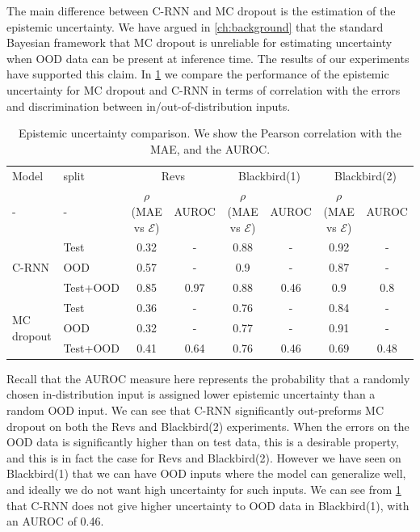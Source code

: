 \documentclass[../main.tex]{subfiles}
\begin{document}
The main difference between C-RNN and MC dropout is the estimation of the epistemic uncertainty. We have argued in \cref{ch:background} that the standard Bayesian framework that MC dropout is unreliable for estimating uncertainty when OOD data can be present at inference time. The results of our experiments have supported this claim. In \cref{tbl:epistemic_comparison} we compare the performance of the epistemic uncertainty for MC dropout and C-RNN in terms of correlation with the errors and discrimination between in/out-of-distribution inputs. 

\begin{table}[htbp]
\centering
\begin{adjustbox}{max width=\textwidth}
    \begin{tabular}{l l c c c c c c}  
        \toprule
        Model & split & \multicolumn{2}{c}{Revs} & \multicolumn{2}{c}{Blackbird(1)} & \multicolumn{2}{c}{Blackbird(2)}\\
        - & - & $\rho$(MAE vs $\mathcal{E}$) & AUROC &
        $\rho$(MAE vs $\mathcal{E}$) & AUROC & $\rho$(MAE vs $\mathcal{E}$)  & AUROC \\
        \midrule
        \multirow{3}{*}{C-RNN} 
            & Test     & 0.32 & -    & 0.88 & -    & 0.92 & -   \\  
            & OOD      & 0.57 & -    & 0.9  & -    & 0.87 & -   \\  
            & Test+OOD & 0.85 & 0.97 & 0.88 & 0.46 & 0.9  & 0.8 \\ 

        \midrule
        \multirow{3}{*}{MC dropout} 
            & Test     & 0.36 & -    & 0.76  & -    & 0.84 & -  \\  
            & OOD      & 0.32 & -    & 0.77  & -    & 0.91  &  -  \\  
            & Test+OOD & 0.41 & 0.64 & 0.76  & 0.46 & 0.69 & 0.48 \\ 
        
        \toprule
    \end{tabular}
\end{adjustbox}
    \caption[Epistemic uncertainty comparison]{Epistemic uncertainty comparison. We show the Pearson correlation with the MAE, and the AUROC.}
    \label{tbl:epistemic_comparison}
\end{table}

Recall that the AUROC measure here represents the probability that a randomly chosen in-distribution input is assigned lower epistemic uncertainty than a random OOD input. We can see that C-RNN significantly out-preforms MC dropout on both the Revs and Blackbird(2) experiments. When the errors on the OOD data is significantly higher than on test data, this is a desirable property, and this is in fact the case for Revs and Blackbird(2). However we have seen on Blackbird(1) that we can have OOD inputs where the model can generalize well, and ideally we do not want high uncertainty for such inputs. We can see from \cref{tbl:epistemic_comparison} that C-RNN does not give higher uncertainty to OOD data in Blackbird(1), with an AUROC of 0.46. 
\end{document}
